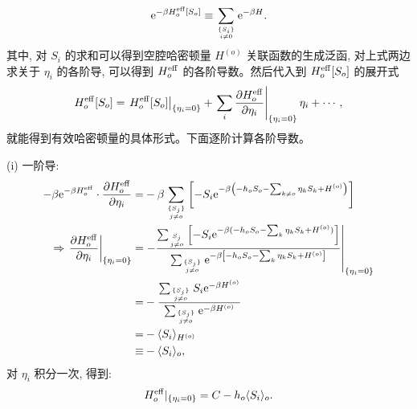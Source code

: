 \begin{equation}
    \mathrm{e}^{-\beta H_o^{\mathrm{eff}}[S_o]}\equiv \sum_{\{ S_i \}\atop i\ne 0}\mathrm{e}^{-\beta H}.
\end{equation}
其中, 对 $S_i$ 的求和可以得到空腔哈密顿量 $H^{(o)}$ 关联函数的生成泛函, 对上式两边求关于 $\eta_i$ 的各阶导, 可以得到 $H_{o}^{\mathrm{eff}}$ 的各阶导数。然后代入到 $H_o^{\mathrm{eff}}[S_o]$ 的展开式
\begin{equation}
    H_o^{\mathrm{eff}}[S_o]=\left. H_o^{\mathrm{eff}}[S_o]\right|_{\{\eta_i=0\}} +\left.\sum_i\frac{\partial H_o^{\mathrm{eff}}}{\partial \eta_i}\right|_{\{\eta_i=0\}}\eta_i+\cdots,
\end{equation}
就能得到有效哈密顿量的具体形式。下面逐阶计算各阶导数。

(i) 一阶导:
\begin{equation}
    \begin{aligned}
        -\beta \mathrm{e}^{-\beta H_o^{\mathrm{eff}}}\cdot \frac{\partial H_{o}^{\mathrm{eff}}}{\partial \eta_i}=&-\beta \sum_{\{S_j\}\atop j\ne o}\left[ -S_i\mathrm{e}^{-\beta\left( -h_oS_o-\sum_{k\ne o}\eta_kS_k+H^{(o)} \right)} \right]\\
        \Rightarrow \left.\frac{\partial H_{o}^{\mathrm{eff}}}{\partial \eta_i}\right|_{\{\eta_i=0\}}=&\left.-\frac{\sum_{S_j\atop j\ne o}\left[ -S_i\mathrm{e}^{-\beta(-h_oS_o-\sum_k\eta_kS_k+H^{(o)})} \right]}{\sum_{\{S_j\}\atop j\ne o}\mathrm{e}^{-\beta\left[ -h_o S_o-\sum_k \eta_kS_k +H^{(o)} \right]}}\right|_{\{\eta_i=0\}}\\
        =&-\frac{\sum_{\{S_j\}\atop j\ne o}S_i\mathrm{e}^{-\beta H^{(o)}}}{\sum_{\{S_j\}\atop j\ne o}\mathrm{e}^{-\beta H^{(o)}}}\\
        = &-\langle S_i \rangle_{H^{(o)}}\\
        \equiv & -\langle S_i \rangle_o,
    \end{aligned}
\end{equation}
对 $\eta_i$ 积分一次, 得到:
\begin{equation}
    H_{o}^{\mathrm{eff}}|_{\{\eta_i=0\}} = C-h_o\langle S_i \rangle_o.
\end{equation}


